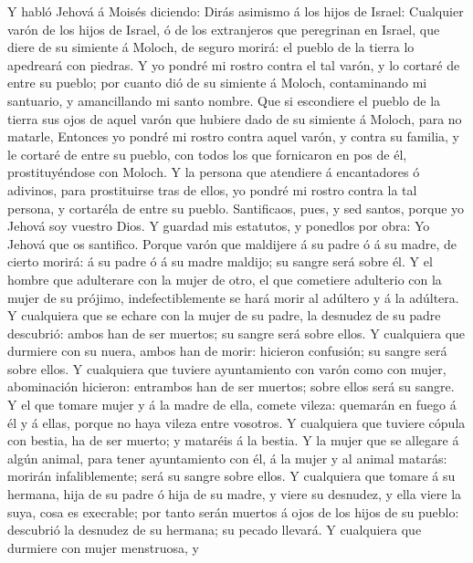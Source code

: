  Y habló Jehová á Moisés diciendo:  Dirás
asimismo á los hijos de Israel: Cualquier varón de los hijos de Israel,
ó de los extranjeros que peregrinan en Israel, que diere de su simiente
á Moloch, de seguro morirá: el pueblo de la tierra lo apedreará con
piedras.  Y yo pondré mi rostro contra el tal varón, y lo
cortaré de entre su pueblo; por cuanto dió de su simiente á Moloch,
contaminando mi santuario, y amancillando mi santo nombre. 
Que si escondiere el pueblo de la tierra sus ojos de aquel varón que
hubiere dado de su simiente á Moloch, para no matarle, 
Entonces yo pondré mi rostro contra aquel varón, y contra su familia, y
le cortaré de entre su pueblo, con todos los que fornicaron en pos de
él, prostituyéndose con Moloch.  Y la persona que atendiere
á encantadores ó adivinos, para prostituirse tras de ellos, yo pondré mi
rostro contra la tal persona, y cortaréla de entre su pueblo.
 Santificaos, pues, y sed santos, porque yo Jehová soy
vuestro Dios.  Y guardad mis estatutos, y ponedlos por obra:
Yo Jehová que os santifico.  Porque varón que maldijere á su
padre ó á su madre, de cierto morirá: á su padre ó á su madre maldijo;
su sangre será sobre él.  Y el hombre que adulterare con la
mujer de otro, el que cometiere adulterio con la mujer de su prójimo,
indefectiblemente se hará morir al adúltero y á la adúltera.
 Y cualquiera que se echare con la mujer de su padre, la
desnudez de su padre descubrió: ambos han de ser muertos; su sangre será
sobre ellos.  Y cualquiera que durmiere con su nuera, ambos
han de morir: hicieron confusión; su sangre será sobre ellos.
 Y cualquiera que tuviere ayuntamiento con varón como con
mujer, abominación hicieron: entrambos han de ser muertos; sobre ellos
será su sangre.  Y el que tomare mujer y á la madre de
ella, comete vileza: quemarán en fuego á él y á ellas, porque no haya
vileza entre vosotros.  Y cualquiera que tuviere cópula con
bestia, ha de ser muerto; y mataréis á la bestia.  Y la
mujer que se allegare á algún animal, para tener ayuntamiento con él, á
la mujer y al animal matarás: morirán infaliblemente; será su sangre
sobre ellos.  Y cualquiera que tomare á su hermana, hija de
su padre ó hija de su madre, y viere su desnudez, y ella viere la suya,
cosa es execrable; por tanto serán muertos á ojos de los hijos de su
pueblo: descubrió la desnudez de su hermana; su pecado llevará.
 Y cualquiera que durmiere con mujer menstruosa, y

